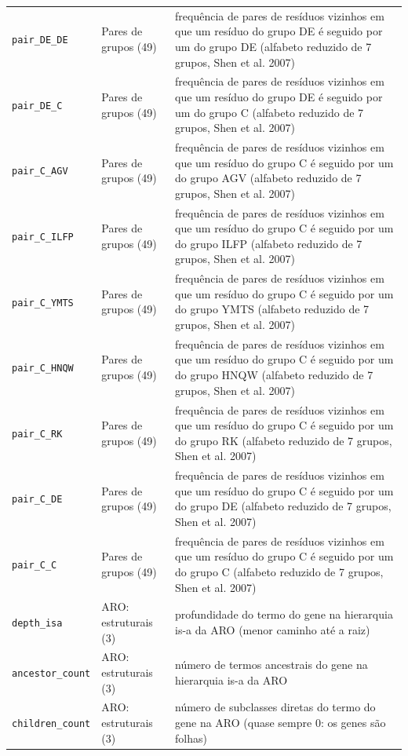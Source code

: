 \begin{longtable}{p{4.2cm}p{2.6cm}p{8cm}}
  \texttt{pair\_DE\_DE} & Pares de grupos (49) & frequência de pares de resíduos vizinhos em que um resíduo do grupo {DE} é seguido por um do grupo {DE} (alfabeto reduzido de 7 grupos, Shen et al. 2007) \\
  \texttt{pair\_DE\_C} & Pares de grupos (49) & frequência de pares de resíduos vizinhos em que um resíduo do grupo {DE} é seguido por um do grupo {C} (alfabeto reduzido de 7 grupos, Shen et al. 2007) \\
  \texttt{pair\_C\_AGV} & Pares de grupos (49) & frequência de pares de resíduos vizinhos em que um resíduo do grupo {C} é seguido por um do grupo {AGV} (alfabeto reduzido de 7 grupos, Shen et al. 2007) \\
  \texttt{pair\_C\_ILFP} & Pares de grupos (49) & frequência de pares de resíduos vizinhos em que um resíduo do grupo {C} é seguido por um do grupo {ILFP} (alfabeto reduzido de 7 grupos, Shen et al. 2007) \\
  \texttt{pair\_C\_YMTS} & Pares de grupos (49) & frequência de pares de resíduos vizinhos em que um resíduo do grupo {C} é seguido por um do grupo {YMTS} (alfabeto reduzido de 7 grupos, Shen et al. 2007) \\
  \texttt{pair\_C\_HNQW} & Pares de grupos (49) & frequência de pares de resíduos vizinhos em que um resíduo do grupo {C} é seguido por um do grupo {HNQW} (alfabeto reduzido de 7 grupos, Shen et al. 2007) \\
  \texttt{pair\_C\_RK} & Pares de grupos (49) & frequência de pares de resíduos vizinhos em que um resíduo do grupo {C} é seguido por um do grupo {RK} (alfabeto reduzido de 7 grupos, Shen et al. 2007) \\
  \texttt{pair\_C\_DE} & Pares de grupos (49) & frequência de pares de resíduos vizinhos em que um resíduo do grupo {C} é seguido por um do grupo {DE} (alfabeto reduzido de 7 grupos, Shen et al. 2007) \\
  \texttt{pair\_C\_C} & Pares de grupos (49) & frequência de pares de resíduos vizinhos em que um resíduo do grupo {C} é seguido por um do grupo {C} (alfabeto reduzido de 7 grupos, Shen et al. 2007) \\
  \texttt{depth\_isa} & ARO: estruturais (3) & profundidade do termo do gene na hierarquia is-a da ARO (menor caminho até a raiz) \\
  \texttt{ancestor\_count} & ARO: estruturais (3) & número de termos ancestrais do gene na hierarquia is-a da ARO \\
  \texttt{children\_count} & ARO: estruturais (3) & número de subclasses diretas do termo do gene na ARO (quase sempre 0: os genes são folhas) \\

\end{longtable}
